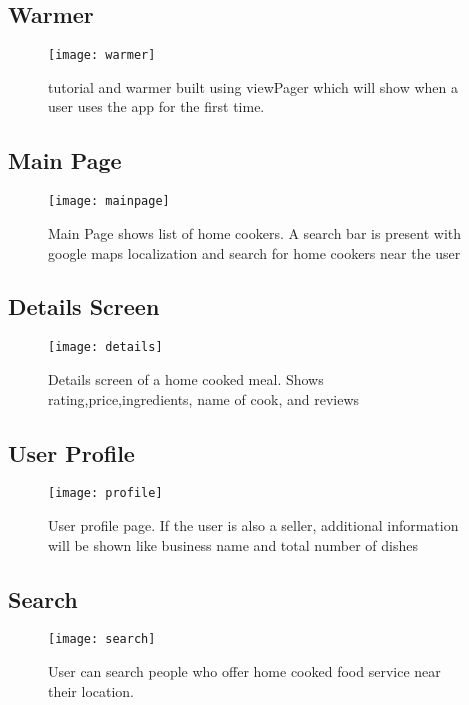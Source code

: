 \documentclass{article}
\begin{document}
  \subsection{Warmer}
  \begin{figure}[!ht]
    \centering
    \texttt{[image: warmer]}
    \caption{tutorial and warmer built using viewPager which will show when a user uses the app for the first time. }
    \label{fig:warmer}
    \end{figure}

  \subsection{Main Page}
  \begin{figure}[!ht]
    \centering
    \texttt{[image: mainpage]}
    \caption{Main Page shows list of home cookers. A search bar is present with google maps localization and search for home cookers near the user }
    \label{fig:mainpage}
    \end{figure}

    
  \subsection{Details Screen}
  \begin{figure}[!ht]
    \centering
    \texttt{[image: details]}
    \caption{Details screen of a home cooked meal. Shows rating,price,ingredients, name of cook, and reviews }
    \label{fig:details}
    \end{figure}

  \subsection{User Profile}
  \begin{figure}[!ht]
    \centering
    \texttt{[image: profile]}
    \caption{User profile page. If the user is also a seller, additional information will be shown like business name and total number of dishes }
    \label{fig:profile}
    \end{figure}

  \subsection{Search}
  \begin{figure}[!ht]
    \centering
    \texttt{[image: search]}
    \caption{ User can search people who offer home cooked food service near their location. }
    \label{fig:search}
    \end{figure}
\end{document}
